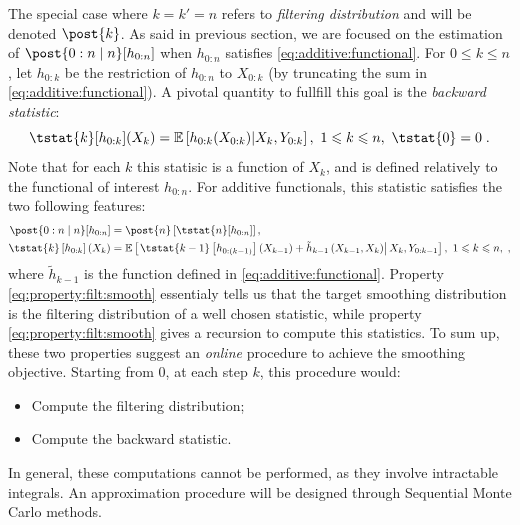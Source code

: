 \documentclass{article}
\newcommand{\af}[1]{h_{#1}}
\newcommand{\addf}[1]{\termletter_{#1}}
\newcommand{\termletter}{\tilde{h}}
\def\pE{\mathbb{E}}
\newcommand{\eqsp}{\;}
\begin{document}
The special case where $k = k' = n$ refers to \textit{filtering distribution} and will be denoted $\post{k}$.
As said in previous section, we are focused on the estimation of $\post{0:n \mid n}[\af{0:n}]$ when $\af{0:n}$ satisfies \eqref{eq:additive:functional}.
For $0\leqslant k\leqslant n$, let $\af{0:k}$ be the restriction of $\af{0:n}$ to $X_{0:k}$ (by truncating the sum in \eqref{eq:additive:functional}).
A pivotal quantity to fullfill this goal is the \textit{backward statistic}:
\begin{equation}
\label{eq:T:stat}
\tstat{k}[\af{0:k}](X_k) = \pE \left[\af{0:k}(X_{0:k        }) \middle | X_k, Y_{0:k}\right],~1\leqslant k \leqslant n,~\tstat{0} = 0\eqsp.
\end{equation}
Note that for each $k$ this statisic is a function of $X_k$, and is defined relatively to the functional of interest $\af{0:n}$.
For additive functionals, this statistic satisfies the two following features:
\begin{align}
\post{0:n \mid n}[\af{0:n}] &= \post{n}\left[\tstat{n}[\af{0:n}] \right], \label{eq:property:filt:smooth}\\
\tstat{k}\left[\af{0:k}\right](X_{k}) &= \pE\left[\left.\tstat{k-1}\left[\af{0:(k-1)}\right]\left(X_{k-1}\right) + \addf{k-1}\left(X_{k-1},X_{k}\right)\right|X_{k},Y_{0:k-1} \right],~1\leqslant k \leqslant n,\eqsp, \label{eq:property:backward}
\end{align} 
where $\addf{k-1}$ is the function defined in \eqref{eq:additive:functional}.
Property \eqref{eq:property:filt:smooth} essentialy tells us that the target smoothing distribution is the filtering distribution of a well chosen statistic, while property \eqref{eq:property:filt:smooth} gives a recursion to compute this statistics. 
To sum up, these two properties suggest an \textit{online} procedure to achieve the smoothing objective. Starting from 0, at each step $k$, this procedure would:
\begin{itemize}
\item Compute the filtering distribution;
\item Compute the backward statistic.
\end{itemize}
In general, these computations cannot be performed, as they involve intractable integrals. 
An approximation procedure will be designed through Sequential Monte Carlo methods.
\end{document}
